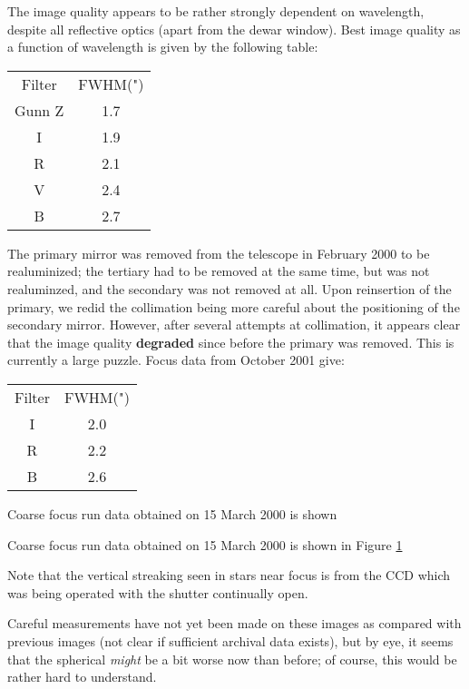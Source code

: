 \documentclass{article}[12pt]
\begin{document}
The image quality appears to be rather strongly dependent on wavelength,
despite all reflective optics (apart from the dewar window). Best image
quality as a function of wavelength is given by the following table:

\begin{tabular}{cc}
Filter&FWHM(")\\
Gunn Z& 1.7\\
I & 1.9\\
R & 2.1\\
V & 2.4\\
B & 2.7
\end{tabular}

The primary mirror was removed from the telescope in February 2000 to be
realuminized; the tertiary had to be removed at the same time, but was
not realuminzed, and the secondary was not removed at all. Upon reinsertion
of the primary, we redid the collimation being more careful about the
positioning of the secondary mirror. However, after several attempts at
collimation, it appears clear that the image quality \textbf{degraded}
since before the primary was removed. This is currently a large puzzle.
Focus data from October 2001 give:

\begin{tabular}{cc}
Filter&FWHM(")\\
I & 2.0\\
R & 2.2\\
B & 2.6
\end{tabular}

\begin{htmlonly}
Coarse focus run data obtained on 15 March 2000 is shown 
\end{htmlonly}

\begin{latexonly}
Coarse focus run data obtained on 15 March 2000 is shown in Figure
\ref{fig:000315coarse}
\begin{figure}
\label{fig:000315coarse}
\end{figure}
\end{latexonly}

Note that the vertical streaking seen in stars near focus is from the
CCD which was being operated with the shutter continually open.

Careful measurements have not yet been made on these images as compared
with previous images (not clear if sufficient archival data exists), but
by eye, it seems that the spherical \textit{might} be a bit worse now
than before; of course, this would be rather hard to understand.
\end{document}
